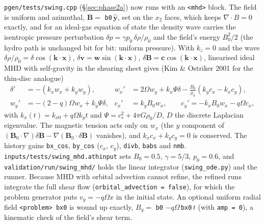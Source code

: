 \documentclass[11pt]{article}
\newcommand{\code}[1]{\texttt{#1}}
\newcommand{\file}[1]{\texttt{\small #1}}
\begin{document}
\file{pgen/tests/swing.cpp} (\S\ref{sec:phase2a}) now runs with an \code{<mhd>} block. The
field is uniform and azimuthal, $\mathbf B = $ \code{b0}$\,\hat{\mathbf y}$, set on the
$x_2$ faces, which keeps $\nabla\!\cdot\!B = 0$ exactly, and for an ideal-gas equation of
state the density wave carries the isentropic pressure perturbation
$\delta p = \gamma p_0\,\delta\rho/\rho_0$ and the field's energy $B_0^2/2$ (the hydro path
is unchanged bit for bit: uniform pressure). With $k_z = 0$ and the wave
$\delta\rho/\rho_0 = \delta\cos(\mathbf k\cdot\mathbf x)$,
$\delta\mathbf v = \mathbf w\sin(\mathbf k\cdot\mathbf x)$,
$\delta\mathbf B = \mathbf c\cos(\mathbf k\cdot\mathbf x)$, linearised ideal MHD with
self-gravity in the shearing sheet gives (Kim \& Ostriker 2001 for the thin-disc analogue)
\begin{equation}
\begin{aligned}
  \delta' &= -(k_x w_x + k_y w_y), &
  w_x' &= 2\Omega w_y + k_x\Psi\delta - \frac{B_0}{\rho_0}(k_y c_x - k_x c_y),\\
  w_y' &= -(2-q)\Omega w_x + k_y\Psi\delta, &
  c_x' &= k_y B_0 w_x, \qquad c_y' = -k_x B_0 w_x - q\Omega c_x,
\end{aligned}
\end{equation}
with $k_x(t) = k_{x0} + q\Omega k_y t$ and $\Psi = c_s^2 + 4\pi G\rho_0/D$, $D$ the discrete
Laplacian eigenvalue. The magnetic tension acts only on $w_x$ (the $y$ component of
$(\mathbf B_0\!\cdot\!\nabla)\delta\mathbf B - \nabla(\mathbf B_0\!\cdot\!\delta\mathbf B)$
vanishes), and $k_x c_x + k_y c_y = 0$ is conserved. The history gains \code{bx\_cos},
\code{by\_cos} ($c_x$, $c_y$), \code{divb}, \code{babs} and \code{nmb}.
\file{inputs/tests/swing\_mhd.athinput} sets $B_0 = 0.5$, $\gamma = 5/3$, $p_0 = 0.6$, and
\file{validation/run/swing\_mhd/} holds the linear integrator (\file{swing\_ode.py}) and the
runner. Because MHD with orbital advection cannot refine, the refined runs integrate the
full shear flow (\code{orbital\_advection = false}), for which the problem generator puts
$v_y = -q\Omega x$ in the initial state. An optional uniform radial field \code{<problem> bx0} is wound up exactly,
$B_y = $ \code{b0} $- q\Omega\,$\code{bx0}$\,t$ (with \code{amp = 0}), a kinematic check of the
field's shear term.
\end{document}

